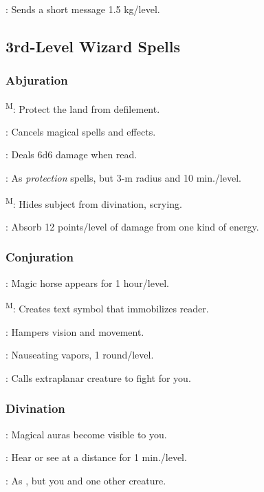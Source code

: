 	: Sends a short message 1.5 kg/level.



\subsection{3rd-Level Wizard Spells}

\subsubsection{Abjuration}
	\textsuperscript{M}: Protect the land from defilement. %

	: Cancels magical spells and effects.

	: Deals 6d6 damage when read.

	: As \emph{protection} spells, but 3-m radius and 10 min./level.

	\textsuperscript{M}: Hides subject from divination, scrying.

	: Absorb 12 points/level of damage from one kind of energy.

\subsubsection{Conjuration}
	: Magic horse appears for 1 hour/level.

	\textsuperscript{M}: Creates text symbol that immobilizes reader.

	: Hampers vision and movement.

	: Nauseating vapors, 1 round/level.

	: Calls extraplanar creature to fight for you.

\subsubsection{Divination}
	: Magical auras become visible to you.

	: Hear or see at a distance for 1 min./level.

	: As , but you and one other creature.

